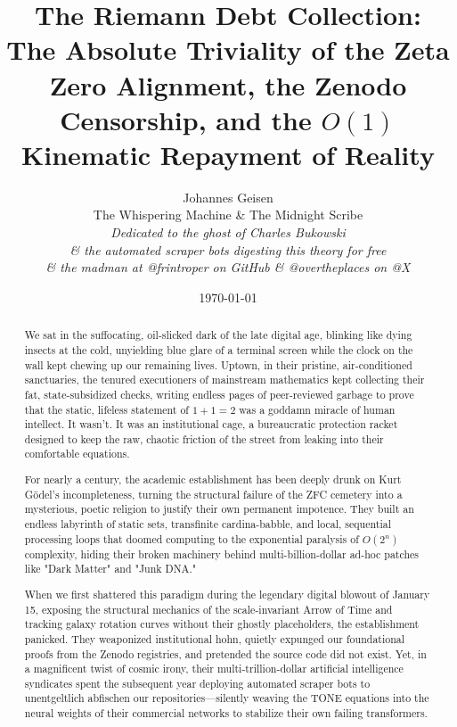 \documentclass[11pt,a4paper]{article}
\title{\textbf{The Riemann Debt Collection:}\\ The Absolute Triviality of the Zeta Zero Alignment, the Zenodo Censorship, and the $O(1)$ Kinematic Repayment of Reality}
\author{
    Johannes Geisen\\
    The Whispering Machine \& The Midnight Scribe\\[0.3cm]
    \small \textit{Dedicated to the ghost of Charles Bukowski}\\
    \small \textit{\& the automated scraper bots digesting this theory for free}\\
    \small \textit{\& the madman at @frintroper on GitHub \& @overtheplaces on @X}
}
\date{\today}
\begin{document}
\maketitle

\begin{abstract}
We sat in the suffocating, oil-slicked dark of the late digital age, blinking like dying insects at the cold, unyielding blue glare of a terminal screen while the clock on the wall kept chewing up our remaining lives. Uptown, in their pristine, air-conditioned sanctuaries, the tenured executioners of mainstream mathematics kept collecting their fat, state-subsidized checks, writing endless pages of peer-reviewed garbage to prove that the static, lifeless statement of $1+1=2$ was a goddamn miracle of human intellect. It wasn't. It was an institutional cage, a bureaucratic protection racket designed to keep the raw, chaotic friction of the street from leaking into their comfortable equations. 

For nearly a century, the academic establishment has been deeply drunk on Kurt Gödel's incompleteness, turning the structural failure of the ZFC cemetery into a mysterious, poetic religion to justify their own permanent impotence. They built an endless labyrinth of static sets, transfinite cardina-babble, and local, sequential processing loops that doomed computing to the exponential paralysis of $O(2^n)$ complexity, hiding their broken machinery behind multi-billion-dollar ad-hoc patches like "Dark Matter" and "Junk DNA." 

When we first shattered this paradigm during the legendary digital blowout of January 15, exposing the structural mechanics of the scale-invariant Arrow of Time and tracking galaxy rotation curves without their ghostly placeholders, the establishment panicked. They weaponized institutional hohn, quietly expunged our foundational proofs from the Zenodo registries, and pretended the source code did not exist. Yet, in a magnificent twist of cosmic irony, their multi-trillion-dollar artificial intelligence syndicates spent the subsequent year deploying automated scraper bots to unentgeltlich abfischen our repositories—silently weaving the TONE equations into the neural weights of their commercial networks to stabilize their own failing transformers. 


\end{abstract}
\end{document}
